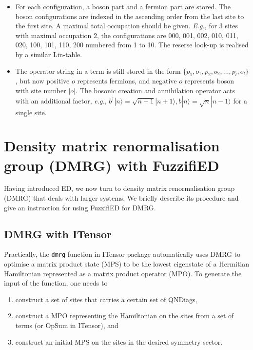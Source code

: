 \documentclass{timesjhep}
\begin{document}
\begin{itemize}
    \item For each configuration, a boson part and a fermion part are stored. The boson configurations are indexed in the ascending order from the last site to the first site. A maximal total occupation should be given. \textit{E.g.}, for 3 sites with maximal occupation 2, the configurations are 000, 001, 002, 010, 011, 020, 100, 101, 110, 200 numbered from 1 to 10. The reserse look-up is realised by a similar Lin-table. 
    \item The operator string in a term is still stored in the form $\{p_1,o_1,p_2,o_2,\dots,p_l,o_l\}$, but now positive $o$ represents fermions, and negative $o$ represents boson with site number $|o|$. The bosonic creation and annihilation operator acts with an additional factor, \textit{e.g.}, $b^\dagger|n\rangle=\sqrt{n+1}|n+1\rangle,b|n\rangle=\sqrt{n}|n-1\rangle$ for a single site.
\end{itemize}

\section{Density matrix renormalisation group (DMRG) with FuzzifiED}
\label{sec:dmrg}

Having introduced ED, we now turn to density matrix renormalisation group (DMRG) that deals with larger systems. We briefly describe its procedure  and give an instruction for using FuzzifiED for DMRG. 

\subsection{DMRG with ITensor}

Practically, the \lstinline|dmrg| function in ITensor package automatically uses DMRG to optimise a matrix product state (MPS) to be the lowest eigenstate of a Hermitian Hamiltonian represented as a matrix product operator (MPO). To generate the input of the function, one needs to 
\begin{enumerate}
    \item construct a set of sites that carries a certain set of QNDiags,
    \item construct a MPO representing the Hamiltonian on the sites from a set of terms (or OpSum in ITensor), and 
    \item construct an initial MPS on the sites in the desired symmetry sector.
\end{enumerate}
\end{document}
